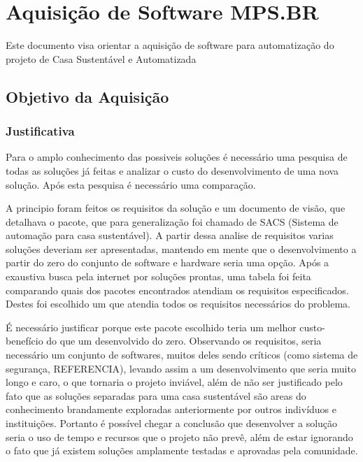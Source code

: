 \chapter{Aquisição de Software MPS.BR}

\begin{center}
Este documento visa orientar a aquisição de software para automatização do projeto de Casa Sustentável e Automatizada
\end{center}

\section{Objetivo da Aquisição}

\subsection{Justificativa}

Para o amplo conhecimento das possiveis soluções é necessário uma pesquisa de todas as soluções já feitas e analizar
o custo do desenvolvimento de uma nova solução. Após esta pesquisa é necessário uma comparação.

A principio foram feitos os requisitos da solução e um documento de visão, que detalhava
o pacote, que para generalização foi chamado de SACS (Sistema de automação para casa sustentável). A partir dessa
analise de requisitos varias soluções deveriam ser apresentadas, mantendo em mente que o desenvolvimento a partir
do zero do conjunto de software e hardware seria uma opção. Após a exaustiva busca pela internet por soluções prontas,
uma tabela foi feita comparando quais dos pacotes encontrados atendiam os requisitos especificados.
Destes foi escolhido um que atendia todos os requisitos necessários do problema.

É necessário justificar porque este pacote escolhido teria um melhor custo-benefício do que um desenvolvido do zero.
Observando os requisitos, seria necessário um conjunto de softwares, muitos deles sendo críticos (como sistema de
segurança, REFERENCIA), levando assim a um desenvolvimento que seria muito longo e caro, o que tornaria o projeto
inviável, além de não ser justificado pelo fato que as soluções separadas para uma casa sustentável são areas do
conhecimento brandamente exploradas anteriormente por outros indivíduos e instituições. Portanto é possível chegar a
conclusão que desenvolver a solução seria o uso de tempo e recursos que o projeto não prevê, além de estar ignorando
o fato que já existem soluções amplamente testadas e aprovadas pela comunidade.


